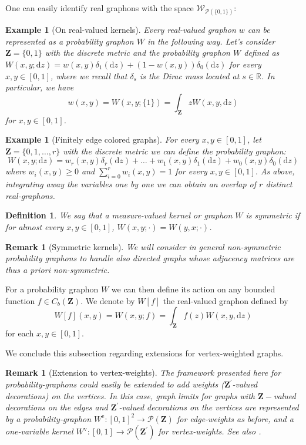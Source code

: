 \documentclass[12pt,twoside,a4paper]{article}
\newtheorem{definition}[theorem]{Definition}
\newtheorem{example}[theorem]{Example}
\newtheorem{remark}[theorem]{Remark}
\def\R{\mathbb{R}}
\newcommand{\Space}{\mathbf{Z}}
\newcommand{\CbFunct}{C_b(\Space)}
\newcommand{\drv}{\mathrm{d}}
\begin{document}
 One can easily identify real graphons with the space $\mathcal{W}_{\mathcal{P}(\{0,1\})}$:

\begin{example}[On real-valued kernels]\label{rem:real-valued-kernels}
Every real-valued  graphon  $w$ can be represented as a probability graphon $W$ in the following way. Let's consider $\Space =\{ 0, 1\}$ with the discrete metric and the probability graphon $W$ defined as $W(x,y;\drv z)  = w(x,y)  \delta_1(\drv z) +  (1-w(x,y)) \delta_0(\drv z)$ for every $x,y\in[0,1]$, where we recall that $\delta_s$ is the Dirac mass located at $s\in \R$. In particular, we have $$w(x,y)=W(x,y; \{1\})=\int_{\Space}z W(x,y,\drv z)$$ for $x,y \in [0, 1]$. 
\end{example}
\begin{example}[Finitely edge colored graphs]\label{rem:finitecoloredgraphs}
 For every $x,y\in[0,1]$, let $\Space=\{0,1,\ldots,r\}$ with the discrete metric we can define the probability graphon: 
$$
W(x,y;\mathrm{d}z)  =w_{r}(x,y)\delta_r(\mathrm{d} z)+\ldots +w_1(x,y)  \delta_1(\mathrm{d} z) +  w_0(x,y) \delta_0(\mathrm{d} z)$$ where $w_i(x,y)\geq 0$ and $\sum^r_{i=0}w_i(x,y)=1$ for every $x,y\in[0,1].$
As above, integrating away the variables one by one we can obtain an overlap of $r$ distinct real-graphons.
\end{example}
\begin{definition}\label{DefSymProbGr}
We say that a measure-valued kernel or graphon $W$ is symmetric 
if for almost every $x,y \in [0,1]$, $W(x,y;\cdot)=W(y,x;\cdot)$.
\end{definition}




\begin{remark}[Symmetric kernels]
We will consider in general non-symmetric probability graphons to handle also directed graphs whose
adjacency matrices are thus \emph{a priori} non-symmetric.
\end{remark}
For a probability graphon $W$ we can then define its action on any bounded function $f\in \CbFunct$. We denote by $W[f]$ the real-valued graphon defined by 
$$
W[f](x,y)=W(x,y;f)=\int_{\Space}f(z)W(x,y,\mathrm{d}z)
$$
for each $x,y\in [0,1].$

We conclude this subsection regarding extensions for vertex-weighted graphs.


\begin{remark}[Extension to vertex-weights]
\label{Rmk:Vertex-Weights1}The framework presented here for probability-graphons could easily be extended to add weights ($\Space^{\prime}$-valued decorations) on the vertices.
In this case, graph limits for graphs with $\Space-$valued decorations on the edges and $\Space^{\prime}$-valued decorations on the vertices are represented by a probability-graphon $W^{\text{e}}:[0,1]^2 \to \mathcal{P}(\Space)$ for edge-weights as before, and a one-variable kernel $W^{\text{v}} : [0,1] \to \mathcal{P}(\Space^{\prime})$ for vertex-weights. See also \cite[Remark 1.7]{abraham2023probabilitygraphons}.
\end{remark}
\end{document}
